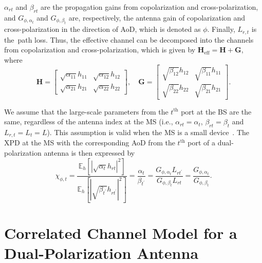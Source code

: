 \documentclass[journal]{IEEEtran}
\begin{document}
$\alpha_{rt}$ and $\beta_{rt}$ are the propagation gains from copolarization and cross-polarization, and $G_{\phi,{\alpha_t}}$ and $G_{\phi,{\beta_t}}$ are, respectively, the antenna gain of copolarization and cross-polarization in the direction of AoD, which is denoted as $\phi$. Finally, $L_{r,t}$ is the~path loss. Thus, the effective channel can be decomposed into the channels from copolarization and cross-polarization, which is given by $\pmb{H}_\text{eff}=\pmb{H}+\pmb{G}$, where
\begin{equation}
\pmb{H}=\begin{bmatrix}
\sqrt{\alpha_{11}}h_{11}&\sqrt{\alpha_{12}}h_{12}\\
\sqrt{\alpha_{21}}h_{21}&\sqrt{\alpha_{22}}h_{22}
\end{bmatrix},\quad\pmb{G}=\begin{bmatrix}
\sqrt{\beta_{12}}h_{12}&\sqrt{\beta_{11}}h_{11}\\
\sqrt{\beta_{22}}h_{22}&\sqrt{\beta_{21}}h_{21}
\end{bmatrix}.\nonumber
\end{equation}

We assume that the large-scale parameters from the $t^\text{th}$ port at the BS are the same, regardless of the antenna index at the MS (i.e., $\alpha_{rt}=\alpha_{t}$, $\beta_{rt}=\beta_{t}$ and $L_{r,t}=L_{t}=L$). This assumption is valid when the MS is a small device~\cite{ComMag_METIS}. The XPD at the MS with the corresponding AoD from the $t^\text{th}$ port of a dual-polarization antenna is then expressed by
\begin{equation}
\chi_{\phi,t}=\frac{\mathbb{E}_{h}[|\sqrt{\alpha_t}h_{rt}|^2]}{\mathbb{E}_{h}[|\sqrt{\beta_{t^\prime}}h_{rt^\prime}|^2]}=\frac{\alpha_t}{\beta_{t^\prime}}=\frac{G_{\phi,\alpha_t}L_{rt^\prime}}{G_{\phi,\beta_t}L_{rt}}=\frac{G_{\phi,\alpha_t}}{G_{\phi,\beta_t}}.
\label{eqXPD}
\end{equation}
%


\section{Correlated Channel Model for a Dual-Polarization Antenna}
\end{document}
